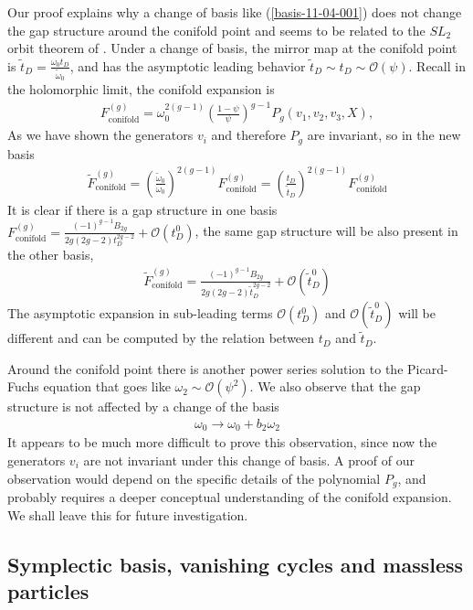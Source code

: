 \documentclass[12pt]{article}
\begin{document}
Our proof explains why a change of basis like
(\ref{basis-11-04-001}) does not change the gap structure around
the conifold point and seems to be related to the $SL_2$ orbit
theorem of \cite{Schmidt,CKS}. Under a change of basis, the mirror map at the
conifold point is
$\tilde{t}_D=\frac{\omega_0t_D}{\tilde{\omega}_0}$, and has the
asymptotic leading behavior $\tilde{t}_D\sim t_D\sim
\mathcal{O}(\psi)$. Recall in the holomorphic limit, the conifold
expansion is
\begin{eqnarray}
F^{(g)}_{\textrm{conifold}} =
\omega_0^{2(g-1)}(\frac{1-\psi}{\psi})^{g-1}P_g(v_1,v_2,v_3,X) ,
\end{eqnarray}
As we have shown the generators $v_i$ and therefore $P_g$ are
invariant, so in the new basis
\begin{eqnarray}
\tilde{F}^{(g)}_{\textrm{conifold}}=
(\frac{\tilde{\omega}_0}{\omega_0})^{2(g-1)}
F^{(g)}_{\textrm{conifold}}=(\frac{t_D}{\tilde{t}_D})^{2(g-1)}
F^{(g)}_{\textrm{conifold}}
\end{eqnarray}
It is clear if there is a gap structure in one basis
$F^{(g)}_{\textrm{conifold}}=\frac{(-1)^{g-1}B_{2g}}{2g(2g-2)t_D^{2g-2}}+\mathcal{O}(t_D^0)$,
the same gap structure will be also present in the other basis,
\begin{eqnarray}
\tilde{F}^{(g)}_{\textrm{conifold}}=\frac{(-1)^{g-1}B_{2g}}{2g(2g-2)\tilde{t}_D^{2g-2}}+\mathcal{O}(\tilde{t}_D^0)
\end{eqnarray}
The asymptotic expansion in sub-leading terms $\mathcal{O}(t_D^0)$
and $\mathcal{O}(\tilde{t}_D^0)$ will be different and can be
computed by the relation between $t_D$ and $\tilde{t}_D$.

Around the conifold point there is another power series solution
to the Picard-Fuchs equation that goes like $\omega_2\sim
\mathcal{O}(\psi^2)$. We also observe that the gap structure is
not affected by a change of the basis
\begin{eqnarray}
\omega_0\rightarrow \omega_0+b_2\omega_2
\end{eqnarray}
It appears to be much more difficult to prove this observation,
since now the generators $v_i$ are not invariant under this change
of basis. A proof of our observation would
depend on the specific details of the polynomial $P_g$, and
probably requires a deeper conceptual understanding of the
conifold expansion. We shall leave this for future investigation.


\subsection{Symplectic basis, vanishing cycles and massless particles}
\label{appendixD-12-06}
\end{document}
